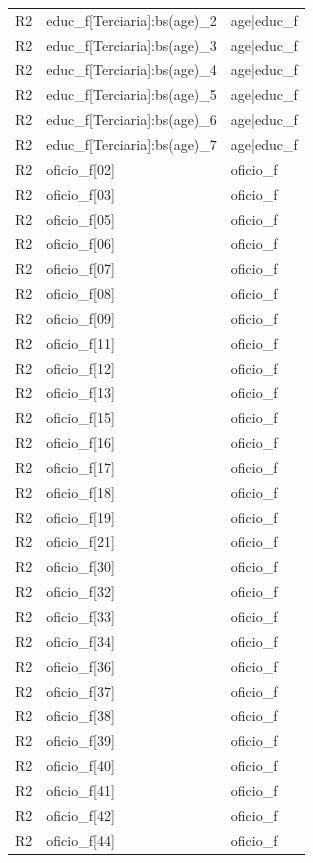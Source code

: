 \begin{longtable}{lll}
R2 & educ\_f[Terciaria]:bs(age)\_2 & age|educ\_f \\
R2 & educ\_f[Terciaria]:bs(age)\_3 & age|educ\_f \\
R2 & educ\_f[Terciaria]:bs(age)\_4 & age|educ\_f \\
R2 & educ\_f[Terciaria]:bs(age)\_5 & age|educ\_f \\
R2 & educ\_f[Terciaria]:bs(age)\_6 & age|educ\_f \\
R2 & educ\_f[Terciaria]:bs(age)\_7 & age|educ\_f \\
R2 & oficio\_f[02] & oficio\_f \\
R2 & oficio\_f[03] & oficio\_f \\
R2 & oficio\_f[05] & oficio\_f \\
R2 & oficio\_f[06] & oficio\_f \\
R2 & oficio\_f[07] & oficio\_f \\
R2 & oficio\_f[08] & oficio\_f \\
R2 & oficio\_f[09] & oficio\_f \\
R2 & oficio\_f[11] & oficio\_f \\
R2 & oficio\_f[12] & oficio\_f \\
R2 & oficio\_f[13] & oficio\_f \\
R2 & oficio\_f[15] & oficio\_f \\
R2 & oficio\_f[16] & oficio\_f \\
R2 & oficio\_f[17] & oficio\_f \\
R2 & oficio\_f[18] & oficio\_f \\
R2 & oficio\_f[19] & oficio\_f \\
R2 & oficio\_f[21] & oficio\_f \\
R2 & oficio\_f[30] & oficio\_f \\
R2 & oficio\_f[32] & oficio\_f \\
R2 & oficio\_f[33] & oficio\_f \\
R2 & oficio\_f[34] & oficio\_f \\
R2 & oficio\_f[36] & oficio\_f \\
R2 & oficio\_f[37] & oficio\_f \\
R2 & oficio\_f[38] & oficio\_f \\
R2 & oficio\_f[39] & oficio\_f \\
R2 & oficio\_f[40] & oficio\_f \\
R2 & oficio\_f[41] & oficio\_f \\
R2 & oficio\_f[42] & oficio\_f \\
R2 & oficio\_f[44] & oficio\_f \\

\end{longtable}
